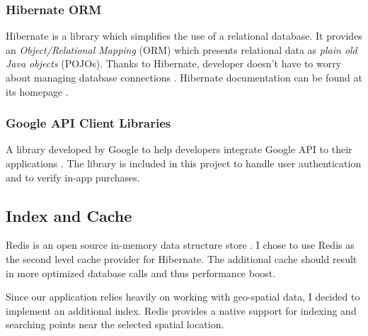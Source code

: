 		\subsubsection*{Hibernate ORM}
		Hibernate is a library which simplifies the use of a relational database. It provides an \textit{Object/Relational Mapping} (ORM) which presents relational data as \textit{plain old Java objects} (POJOs). Thanks to Hibernate, developer doesn't have to worry about managing database connections \cite{hibernatebook}. Hibernate documentation can be found at its homepage \cite{hibernate}.
		
		\subsubsection*{Google API Client Libraries}
		A library developed by Google to help developers integrate Google API to their applications \cite{googleapilibs}. The library is included in this project to handle user authentication and to verify in-app purchases.
		
	\subsection{Index and Cache}
	Redis is an open source in-memory data structure store \cite{redis}. I chose to use Redis as the second level cache provider for Hibernate. The additional cache should result in more optimized database calls and thus performance boost.
	
	Since our application relies heavily on working with geo-spatial data, I decided to implement an additional index. Redis provides a native support for indexing and  searching points near the selected spatial location.		